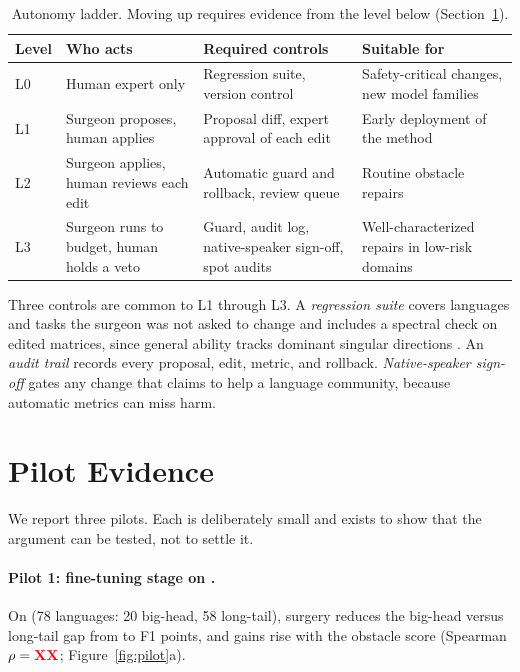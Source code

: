 \documentclass[11pt]{article}
\begin{document}
\begin{table}[t]
\centering\small
\begin{tabular}{l p{3.6cm} p{4.6cm} p{4.2cm}}
\toprule
Level & Who acts & Required controls & Suitable for \\
\midrule
L0 & Human expert only & Regression suite, version control & Safety-critical changes, new model families \\
L1 & Surgeon proposes, human applies & Proposal diff, expert approval of each edit & Early deployment of the method \\
L2 & Surgeon applies, human reviews each edit & Automatic guard and rollback, review queue & Routine obstacle repairs \\
L3 & Surgeon runs to budget, human holds a veto & Guard, audit log, native-speaker sign-off, spot audits & Well-characterized repairs in low-risk domains \\
\bottomrule
\end{tabular}
\caption{Autonomy ladder. Moving up requires evidence from the level below (Section~\ref{sec:pilot}).}
\label{tab:ladder}
\end{table}

Three controls are common to L1 through L3. A \emph{regression suite} covers languages and tasks the surgeon was not asked to change and includes a spectral check on edited matrices, since general ability tracks dominant singular directions \citep{zhang2026revive}. An \emph{audit trail} records every proposal, edit, metric, and rollback. \emph{Native-speaker sign-off} gates any change that claims to help a language community, because automatic metrics can miss harm.

\section{Pilot Evidence}
\label{sec:pilot}
We report three pilots. Each is deliberately small and exists to show that the argument can be tested, not to settle it. 

\paragraph{Pilot 1: fine-tuning stage on \bluff{}.}
On \bluff{} (78 languages: 20 big-head, 58 long-tail), surgery reduces the big-head versus long-tail gap from \xx{} to \xx{} F1 points, and gains rise with the obstacle score (Spearman $\rho=\textcolor{red}{\textbf{XX}}{}$; Figure~\ref{fig:pilot}a).
\end{document}
